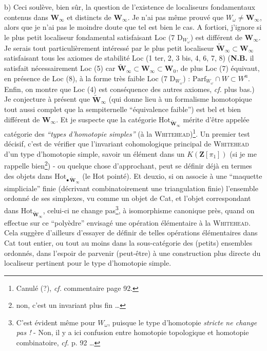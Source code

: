 b) Ceci soulève, bien sûr, la question de l'existence de localiseurs fondamentaux contenus dans $\mathbf{W}_\infty$ et
distincts de $\mathbf{W}_\infty$. Je n'ai pas même prouvé que $W_\omega \neq \mathbf{W}_\infty$, alors que je n'ai pas le moindre doute que tel est bien le cas. A fortiori, j'ignore si le plus petit localiseur fondamental satisfaisant Loc (7 D$_{W_\omega}$) est différent de $\mathbf{W}_\infty$. Je serais tout particulièrement intéressé par le plus petit localiseur $\tilde{\mathbf{W}}_\infty \subset \mathbf{W}_\infty$ satisfaisant tous les axiomes de stabilité Loc (1 ter, 2, 3 bis, 4, 6, 7, 8) (\textbf{N.B.} il satisfait
nécessairement Loc (5) car $\tilde{\mathbf{W}}_\infty \subset \mathbf{W}_\infty \subset \mathbf{W}_0$, de plus Loc (7) équivaut, en présence de Loc (8), à la forme très faible Loc (7 D$_{W_\omega}$) : $\mathrm{Parf}_{W_\omega} \cap W \subset W^{\mathrm{u}}$. Enfin, on montre que Loc (4) est conséquence des autres axiomes, \textit{cf.} plus bas.) Je conjecture à présent que $\tilde{\mathbf{W}}_\infty$ (qui donne lieu à un formalisme homotopique tout aussi complet que la sempiternelle “équivalence faible”) est bel et bien différent de $\mathbf{W}_\infty$. Et je suspecte
que la catégorie $\mathrm{Hot}_{\tilde{\mathbf{W}}_\infty}$ mérite d'être appelée catégorie des \textit{“types d'homotopie simples”} (à la \textsc{Whitehead})\footnote[41]{Canulé (?), \textit{cf.} commentaire page 92.}. Un premier test décisif, c'est de vérifier que l'invariant cohomologique principal de \textsc{Whitehead} d'un type d'homotopie simple, savoir un élément dans un $K(\mathbf{Z}[\pi_1])$ (si je me rappelle bien\footnote[42]{non, c'est un invariant plus fin \ldots}) - ou quelque chose d'approchant, peut se définir déjà en termes des objets dans $\mathrm{Hot}_{\bullet\,\tilde{\mathbf{W}}_\infty}$ (le Hot pointé). Et deuxio, si on associe à une “maquette simpliciale” finie (décrivant combinatoirement une triangulation finie) l'ensemble ordonné de ses simplexes, vu comme un objet de Cat, et l'objet correspondant dans $\mathrm{Hot}_{\tilde{\mathbf{W}}_\infty}$, celui-ci ne change pas\footnote[43]{C'est évident même pour $W_\omega$, puisque le type d'homotopie \textit{stricte ne change pas !} - Non, il y a ici confusion entre homotopie topologique et homotopie combinatoire, \textit{cf.} p. 92 \ldots}, à isomorphisme canonique près, quand on effectue sur ce “polyèdre” envisagé une opération élémentaire à la \textsc{Whitehead}. Cela suggère d'ailleurs d'essayer de définir de telles opérations élémentaires dans Cat tout entier, ou tout au moins dans la sous-catégorie des (petits) ensembles ordonnés, dans l'espoir de parvenir (peut-être) à une construction plus directe du localiseur pertinent pour le type d'homotopie simple.

